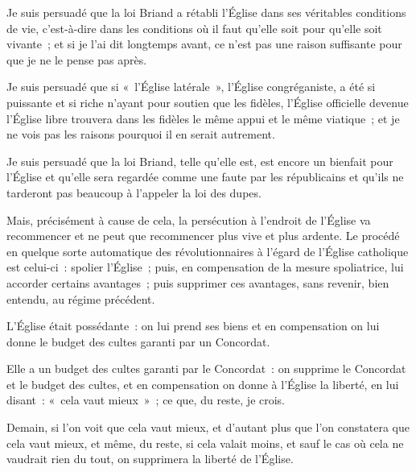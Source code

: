 \documentclass[french,twoside]{book} %
\newcommand{\astertri}{\medskip\par\centerline{\color{rubric}\large\selectfont{\syms ✻\,✻\,✻}}\medskip\par}%
\begin{document}
Je suis persuadé que la loi Briand a rétabli l’Église dans ses véritables conditions de vie, c’est-à-dire dans les conditions où il faut qu’elle soit pour qu’elle soit vivante ; et si je l’ai dit longtemps avant, ce n’est pas une raison suffisante pour que je ne le pense pas après.\par
Je suis persuadé que si « l’Église latérale », l’Église congréganiste, a été si puissante et si riche n’ayant pour soutien que les fidèles, l’Église officielle devenue l’Église libre trouvera dans les fidèles le même appui et le même viatique ; et je ne vois pas les raisons pourquoi il en serait autrement.\par
Je suis persuadé que la loi Briand, telle qu’elle est, est encore un bienfait pour l’Église et qu’elle sera regardée comme une faute par les républicains et qu’ils ne tarderont pas beaucoup à l’appeler la loi des dupes.\par
Mais, précisément à cause de cela, la persécution  à l’endroit de l’Église va recommencer et ne peut que recommencer plus vive et plus ardente. Le procédé en quelque sorte automatique des révolutionnaires à l’égard de l’Église catholique est celui-ci : spolier l’Église ; puis, en compensation de la mesure spoliatrice, lui accorder certains avantages ; puis supprimer ces avantages, sans revenir, bien entendu, au régime précédent.\par
L’Église était possédante : on lui prend ses biens et en compensation on lui donne le budget des cultes garanti par un Concordat.\par
Elle a un budget des cultes garanti par le Concordat : on supprime le Concordat et le budget des cultes, et en compensation on donne à l’Église la liberté, en lui disant : « cela vaut mieux » ; ce que, du reste, je crois.\par
Demain, si l’on voit que cela vaut mieux, et d’autant plus que l’on constatera que cela vaut mieux, et même, du reste, si cela valait moins, et sauf le cas où cela ne vaudrait rien du tout, on supprimera la liberté de l’Église.\par

\astertri
\end{document}
